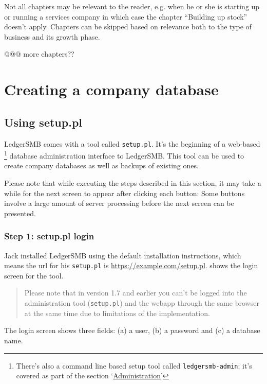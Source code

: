 Not all chapters may be relevant to the reader, e.g. when he or she is starting up or
running a services company in which case the chapter ``Building up stock'' doesn't apply.
Chapters can be skipped based on relevance both to the type of business and its growth
phase.

@@@ more chapters??


\chapter{Creating a company database}
\label{cha-company-creation}

\section{Using setup.pl}
\label{sec-create-using-setup}

LedgerSMB comes with a tool called \texttt{setup.pl}. It's the beginning of a web-based
\footnote{There's also a command line based setup tool called \texttt{ledgersmb-admin}; it's covered as part of the section \lq\hyperref[part-administration]{Administration}\rq}
database administration interface to LedgerSMB. This tool can be used to create
company databases as well as backups  of existing ones.

Please note that while executing the steps described in this section, it may take a while
for the next screen to appear after clicking each button: Some buttons involve
a large amount of server processing before the next screen can be presented.

\subsection{Step 1: setup.pl login}
\label{subsec-create-setup-login}

Jack installed LedgerSMB using the default installation instructions, which means
the url for his \texttt{setup.pl} is \url{https://example.com/setup.pl}.
 shows the login screen for the tool.

\begin{quote}
Please note that in version 1.7 and earlier you can't be logged into the administration tool
(\texttt{setup.pl}) and the webapp through the same browser at the same time due to limitations of the
implementation.
\end{quote}

The login screen shows three fields: (a) a user, (b) a password and (c) a database name.

